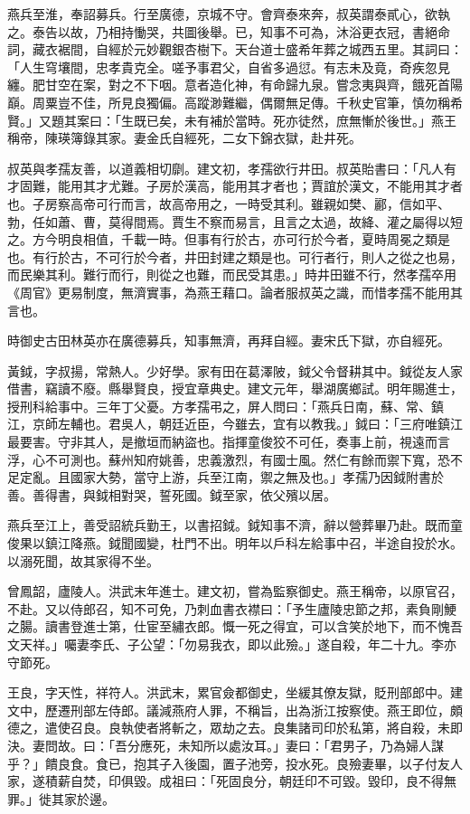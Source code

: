 \begin{pinyinscope}
燕兵至淮，奉詔募兵。行至廣德，京城不守。會齊泰來奔，叔英謂泰貳心，欲執之。泰告以故，乃相持慟哭，共圖後舉。已，知事不可為，沐浴更衣冠，書絕命詞，藏衣裾間，自經於元妙觀銀杏樹下。天台道士盛希年葬之城西五里。其詞曰：「人生穹壤間，忠孝貴克全。嗟予事君父，自省多過愆。有志未及竟，奇疾忽見纏。肥甘空在案，對之不下咽。意者造化神，有命歸九泉。嘗念夷與齊，餓死首陽巔。周粟豈不佳，所見良獨偏。高蹤渺難繼，偶爾無足傳。千秋史官筆，慎勿稱希賢。」又題其案曰：「生既已矣，未有補於當時。死亦徒然，庶無慚於後世。」燕王稱帝，陳瑛簿錄其家。妻金氏自經死，二女下錦衣獄，赴井死。

叔英與孝孺友善，以道義相切劘。建文初，孝孺欲行井田。叔英貽書曰：「凡人有才固難，能用其才尤難。子房於漢高，能用其才者也；賈誼於漢文，不能用其才者也。子房察高帝可行而言，故高帝用之，一時受其利。雖親如樊、酈，信如平、勃，任如蕭、曹，莫得間焉。賈生不察而易言，且言之太過，故絳、灌之屬得以短之。方今明良相值，千載一時。但事有行於古，亦可行於今者，夏時周冕之類是也。有行於古，不可行於今者，井田封建之類是也。可行者行，則人之從之也易，而民樂其利。難行而行，則從之也難，而民受其患。」時井田雖不行，然孝孺卒用《周官》更易制度，無濟實事，為燕王藉口。論者服叔英之識，而惜孝孺不能用其言也。

時御史古田林英亦在廣德募兵，知事無濟，再拜自經。妻宋氏下獄，亦自經死。

黃鉞，字叔揚，常熱人。少好學。家有田在葛澤陂，鉞父令督耕其中。鉞從友人家借書，竊讀不廢。縣舉賢良，授宜章典史。建文元年，舉湖廣鄉試。明年賜進士，授刑科給事中。三年丁父憂。方孝孺弔之，屏人問曰：「燕兵日南，蘇、常、鎮江，京師左輔也。君吳人，朝廷近臣，今雖去，宜有以教我。」鉞曰：「三府唯鎮江最要害。守非其人，是撤垣而納盜也。指揮童俊狡不可任，奏事上前，視遠而言浮，心不可測也。蘇州知府姚善，忠義激烈，有國士風。然仁有餘而禦下寬，恐不足定亂。且國家大勢，當守上游，兵至江南，禦之無及也。」孝孺乃因鉞附書於善。善得書，與鉞相對哭，誓死國。鉞至家，依父殯以居。

燕兵至江上，善受詔統兵勤王，以書招鉞。鉞知事不濟，辭以營葬畢乃赴。既而童俊果以鎮江降燕。鉞聞國變，杜門不出。明年以戶科左給事中召，半途自投於水。以溺死聞，故其家得不坐。

曾鳳韶，廬陵人。洪武末年進士。建文初，嘗為監察御史。燕王稱帝，以原官召，不赴。又以侍郎召，知不可免，乃刺血書衣襟曰：「予生廬陵忠節之邦，素負剛鯁之腸。讀書登進士第，仕宦至繡衣郎。慨一死之得宜，可以含笑於地下，而不愧吾文天祥。」囑妻李氏、子公望：「勿易我衣，即以此殮。」遂自殺，年二十九。李亦守節死。

王良，字天性，祥符人。洪武末，累官僉都御史，坐緩其僚友獄，貶刑部郎中。建文中，歷遷刑部左侍郎。議減燕府人罪，不稱旨，出為浙江按察使。燕王即位，頗德之，遣使召良。良執使者將斬之，眾劫之去。良集諸司印於私第，將自殺，未即決。妻問故。曰：「吾分應死，未知所以處汝耳。」妻曰：「君男子，乃為婦人謀乎？」饋良食。食已，抱其子入後園，置子池旁，投水死。良殮妻畢，以子付友人家，遂積薪自焚，印俱毀。成祖曰：「死固良分，朝廷印不可毀。毀印，良不得無罪。」徙其家於邊。


\end{pinyinscope}
